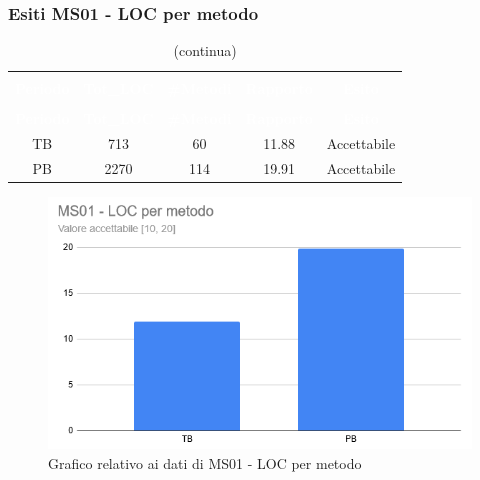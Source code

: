 \subsubsection{Esiti MS01 - LOC per metodo}
\begin{longtable}{c c c c c}
\rowcolor{white}\caption{Esiti MS01 - LOC per metodo} \\
	\rowcolor{redafk}
	\textcolor{white}{\textbf{Periodo}} &
	\textcolor{white}{\textbf{Tot\_LOC}} &
	\textcolor{white}{\textbf{\#Metodi}} &
\textcolor{white}{\textbf{Rapporto}} &
\textcolor{white}{\textbf{Esito}} \\
	\endfirsthead
		\rowcolor{white}\caption[]{(continua)} \\
		\rowcolor{redafk}
	\textcolor{white}{\textbf{Periodo}} &
	\textcolor{white}{\textbf{Tot\_LOC}} &
	\textcolor{white}{\textbf{\#Metodi}} &
\textcolor{white}{\textbf{Rapporto}} &
\textcolor{white}{\textbf{Esito}} \\
	\endhead
	TB & 713 & 60 & 11.88 & Accettabile\\	
	PB & 2270 & 114 & 19.91 & Accettabile \\
\end{longtable}

\begin{figure}[H]
\centering
\includegraphics[scale=0.7]{./img/MS01.png}
\caption{Grafico relativo ai dati di MS01 - LOC per metodo}
\end{figure}

